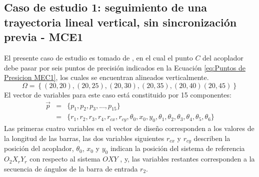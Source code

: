 \subsection{Caso de estudio 1: seguimiento de una trayectoria lineal vertical, sin
sincronización previa - MCE1}
El presente caso de estudio es tomado de \cite{VegaMEC1}, en el cual el punto $C$ del acoplador debe pasar por
seis puntos de precisión indicados en la Ecuación \ref{eq:Puntos de Presicion MEC1}, los cuales se encuentran alineados verticalmente.
\begin{equation}\label{eq:Puntos de Presicion MEC1}
\Omega = \left \{ (20, 20), (20, 25), (20, 30), (20, 35), (20, 40) (20, 45)\right\} 
\end{equation}
El vector de variables para este caso está constituido por 15 componentes:
\begin{eqnarray}\label{eq:Vector variables MEC1}
\vec{p} &=& \{p_1,p_2,p_3,...,p_{15} \}\\
       &=& \{ r_1,r_2,r_3,r_4,r_{cx},r_{cy},\theta_0,x_0,y_0,\theta_1,\theta_2,\theta_3,\theta_4,\theta_5,\theta_6 \} 
\end{eqnarray}
Las primeras cuatro variables en el vector de diseño corresponden a los valores de la longitud de las barras, las dos variables siguientes $r_{cx}$ y $r_{cy}$ describen la posición del acoplador, $\theta_0$, $x_0$ y $y_0$ indican la posición del sistema de referencia $O_2X_rY_r$ con respecto al sistema $OXY$ , y, las variables restantes corresponden a la secuencia de ángulos de la barra de entrada $r_2$.

